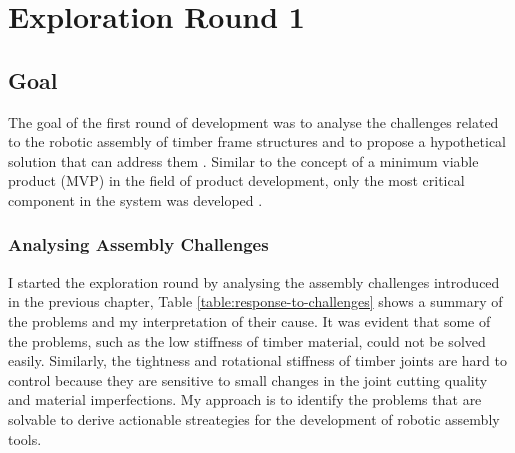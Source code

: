 \chapter{Exploration Round 1}
\label{chapter:exploration-round-1}

\section{Goal}
\label{section:exploration-1-goal}

The goal of the first round of development was to analyse the challenges related to the robotic assembly of timber frame structures and to propose a hypothetical solution that can address them . Similar to the concept of a minimum viable product (MVP) in the field of product development, only the most critical component in the system was developed .

\subsection{Analysing Assembly Challenges}
\label{subsection:exploration-1-analysing-assembly-challenges}

I started the exploration round by analysing the assembly challenges introduced in the previous chapter, Table \ref{table:response-to-challenges} shows a summary of the problems and my interpretation of their cause. It was evident that some of the problems, such as the low stiffness of timber material, could not be solved easily. Similarly, the tightness and rotational stiffness of timber joints are hard to control because they are sensitive to small changes in the joint cutting quality and material imperfections. My approach is to identify the problems that are solvable to derive actionable streategies for the development of robotic assembly tools.

